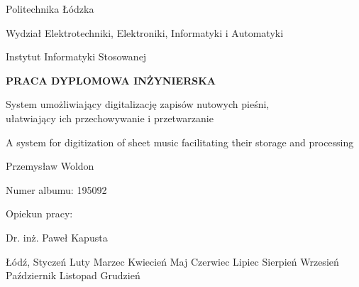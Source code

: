 \documentclass[a4paper,12pt]{article}
\author{Przemysław Woldon}
\date{}
\newcommand{\MONTH}{%
  \ifcase\the\month
  \or Styczeń %
  \or Luty %
  \or Marzec %
  \or Kwiecień %
  \or Maj %
  \or Czerwiec %
  \or Lipiec %
  \or Sierpień %
  \or Wrzesień %
  \or Październik %
  \or Listopad %
  \or Grudzień %
  \fi
}
\begin{document}
    \begingroup
        \fontsize{12pt}{0.2}\selectfont
            \begin{center}Politechnika Łódzka\end{center}
            \begin{center}Wydział Elektrotechniki, Elektroniki, Informatyki i Automatyki\end{center} 
            \begin{center}Instytut Informatyki Stosowanej\end{center} 
        \vspace*{125px}     
        \fontsize{14pt}{0.2}\selectfont
            \begin{center}\textbf{PRACA DYPLOMOWA INŻYNIERSKA}\end{center} 
        \vspace*{50px}
        \fontsize{12pt}{0.2}\selectfont
            \begin{center}System umożliwiający digitalizację zapisów nutowych pieśni, \\\vspace{3mm} ułatwiający ich przechowywanie i przetwarzanie\end{center} \vspace{5mm}
            \begin{center}A system for digitization of sheet music facilitating their storage and processing\end{center} 
        \vspace*{50px}
        \fontsize{12pt}{0.2}\selectfont 
            \begin{center}Przemysław Woldon\end{center} 
            \begin{center}Numer albumu: 195092\end{center} 
        \vspace*{70px}
        \fontsize{12pt}{0.2}\selectfont 
            \begin{flushright}Opiekun pracy:\end{flushright} 
            \begin{flushright}Dr. inż. Paweł Kapusta\end{flushright} 
        \vspace*{185px}
        \fontsize{12pt}{0.2}\selectfont 
            \begin{center}Łódź, \MONTH \vspace{2cm}  \the\year \end{center} 
            \thispagestyle{empty}
    \endgroup
	\newpage
	
\end{document}
